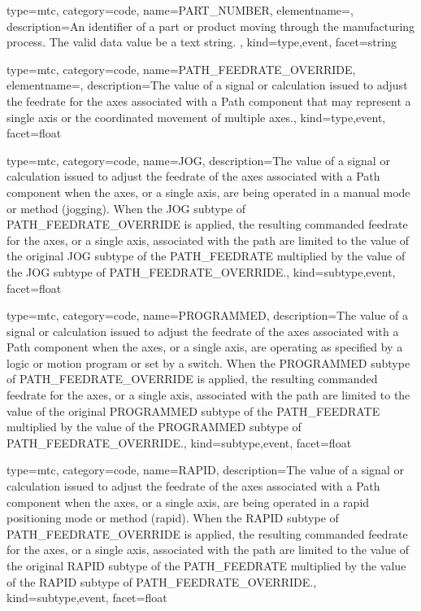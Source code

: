 {
  type=mtc,
  category=code,
  name={PART\_NUMBER},
  elementname=,
  description={An identifier of a part or product moving through the manufacturing process.  The \gls{valid data value} \must be a text string. },
  kind={type,event},
  facet={\gls{string}}
}


{
  type=mtc,
  category=code,
  name={PATH\_FEEDRATE\_OVERRIDE},
  elementname=,
  description={The value of a signal or calculation issued to adjust the feedrate for the axes associated with a Path component that may represent a single axis or the coordinated movement of multiple axes.},
  kind={type,event},
  facet={\gls{float}}
}


{
  type=mtc,
  category=code,
  name={JOG},
  description={The value of a signal or calculation issued to adjust the feedrate of the axes associated with a Path component when the axes, or a single axis, are being operated in a manual mode or method (jogging).   \newline When the JOG subtype of PATH\_FEEDRATE\_OVERRIDE is applied, the resulting commanded feedrate for the axes, or a single axis, associated with the path are limited to the value of the original JOG subtype of the PATH\_FEEDRATE multiplied by the value of the JOG subtype of PATH\_FEEDRATE\_OVERRIDE.},
  kind={subtype,event},
  facet={\gls{float}}
}


{
  type=mtc,
  category=code,
  name={PROGRAMMED},
  description={The value of a signal or calculation issued to adjust the feedrate of the axes associated with a Path component when the axes, or a single axis, are operating as specified by a logic or motion program or set by a switch. \newline When the PROGRAMMED subtype of PATH\_FEEDRATE\_OVERRIDE is applied, the resulting commanded feedrate for the axes, or a single axis, associated with the path are limited to the value of the original PROGRAMMED subtype of the PATH\_FEEDRATE multiplied by the value of the PROGRAMMED subtype of PATH\_FEEDRATE\_OVERRIDE.},
  kind={subtype,event},
  facet={\gls{float}}
}


{
  type=mtc,
  category=code,
  name={RAPID},
  description={The value of a signal or calculation issued to adjust the feedrate of the axes associated with a Path component when the axes, or a single axis, are being operated in a rapid positioning mode or method (rapid).   \newline When the RAPID subtype of PATH\_FEEDRATE\_OVERRIDE is applied, the resulting commanded feedrate for the axes, or a single axis, associated with the path are limited to the value of the original RAPID subtype of the PATH\_FEEDRATE multiplied by the value of the RAPID subtype of PATH\_FEEDRATE\_OVERRIDE.},
  kind={subtype,event},
  facet={\gls{float}}
}


